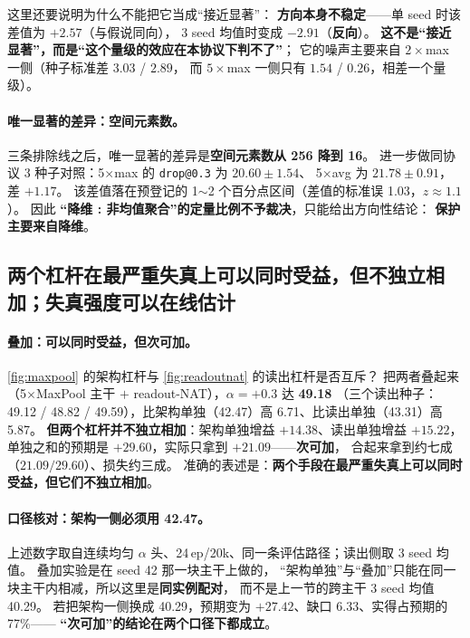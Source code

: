 \documentclass[11pt,a4paper]{ctexart}
\begin{document}
这里还要说明为什么不能把它当成“接近显著”：
\textbf{方向本身不稳定}——单 seed 时该差值为 $+2.57$（与假说同向），
3 seed 均值时变成 $-2.91$（\textbf{反向}）。
\textbf{这不是“接近显著”，而是“这个量级的效应在本协议下判不了”}；
它的噪声主要来自 $2\times$max 一侧（种子标准差 $3.03$ / $2.89$，
而 $5\times$max 一侧只有 $1.54$ / $0.26$，相差一个量级）。

\paragraph{唯一显著的差异：空间元素数。}
三条排除线之后，唯一显著的差异是\textbf{空间元素数从 256 降到 16}。
进一步做同协议 3 种子对照：5$\times$max 的 \texttt{drop@0.3} 为 $20.60\pm1.54$、
5$\times$avg 为 $21.78\pm0.91$，差 $+1.17$。
该差值落在预登记的 1$\sim$2 个百分点区间（差值的标准误 1.03，$z\approx1.1$）。
因此 \textbf{“降维 : 非均值聚合”的定量比例不予裁决}，只能给出方向性结论：
\textbf{保护主要来自降维}。

\subsection{两个杠杆在最严重失真上可以同时受益，但不独立相加；失真强度可以在线估计}

\paragraph{叠加：可以同时受益，但次可加。}
\cref{fig:maxpool} 的架构杠杆与 \cref{fig:readoutnat} 的读出杠杆是否互斥？
把两者叠起来（5$\times$MaxPool 主干 $+$ readout-NAT），$\alpha=+0.3$ 达 \textbf{49.18}
（三个读出种子：49.12 / 48.82 / 49.59），比架构单独（42.47）高 6.71、比读出单独（43.31）高 5.87。
\textbf{但两个杠杆并不独立相加}：架构单独增益 $+14.38$、读出单独增益 $+15.22$，
单独之和的预期是 $+29.60$，实际只拿到 $+21.09$——\textbf{次可加}，
合起来拿到约七成（$21.09/29.60$）、损失约三成。
准确的表述是：\textbf{两个手段在最严重失真上可以同时受益，但它们不独立相加}。

\paragraph{口径核对：架构一侧必须用 42.47。}
上述数字取自连续均匀 $\alpha$ 头、24\,ep/20k、同一条评估路径；读出侧取 3 seed 均值。
叠加实验是在 seed 42 那一块主干上做的，
“架构单独”与“叠加”只能在同一块主干内相减，所以这里是\textbf{同实例配对}，
而不是上一节的跨主干 3 seed 均值 40.29。
若把架构一侧换成 40.29，预期变为 $+27.42$、缺口 6.33、实得占预期的 77\%——
\textbf{“次可加”的结论在两个口径下都成立}。
\end{document}
